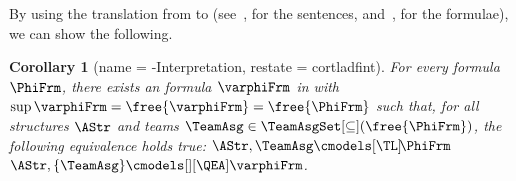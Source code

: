 \documentclass[authoryear]{elsarticle}
\newtheorem{corollary}{Corollary}
\begin{document}

By using the translation from \TL to \SOL (see~\citep{Vaa07,Har79}, for the
sentences, and~\citep{KV09,KN09}, for the formulae), we can show the following.

\begin{corollary}[name = \TL-\ADF Interpretation, restate = cortladfint]
  \label{cor:tladfint}
  For every \TL formula $\PhiFrm$, there exists an \ADF formula $\varphiFrm$ in
  \pnf with $\sup{\varphiFrm} = \free{\varphiFrm} = \free{\PhiFrm}$ such that,
  for all structures $\AStr$ and teams $\TeamAsg \in
  \TeamAsgSet[\subseteq](\free{\PhiFrm})$, the following equivalence holds
  true: $\AStr, \TeamAsg \cmodels[\TL]\! \PhiFrm$ \iff $\AStr, \{ \TeamAsg \}
  \cmodels[][\QEA] \varphiFrm$.
\end{corollary}








\end{document}
